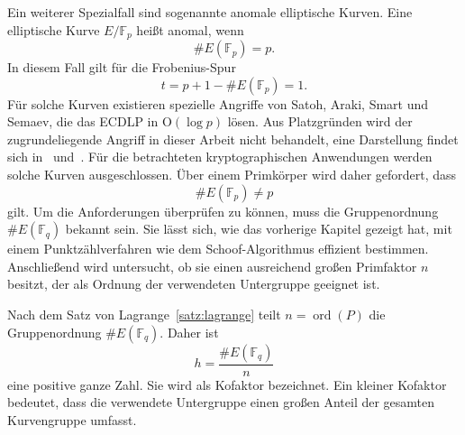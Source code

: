 Ein weiterer Spezialfall sind sogenannte anomale elliptische Kurven. Eine elliptische Kurve $E/\mathbb F_p$ heißt anomal, wenn
\[
    \#E(\mathbb F_p)=p.
\]
In diesem Fall gilt für die Frobenius-Spur
\[
    t=p+1-\#E(\mathbb F_p)=1.
\]
Für solche Kurven existieren spezielle Angriffe von Satoh, Araki, Smart und Semaev, die das ECDLP in $\mathrm{O}(\log p)$ lösen. Aus Platzgründen wird der zugrundeliegende Angriff in dieser Arbeit nicht behandelt, eine Darstellung findet sich in~\cite[S.~89--95]{werner02} und~\cite{smart99}. Für die betrachteten kryptographischen Anwendungen werden solche Kurven ausgeschlossen. Über einem Primkörper wird daher gefordert, dass
\[
    \#E(\mathbb{F}_p)\neq p
\]
gilt. Um die Anforderungen überprüfen zu können, muss die Gruppenordnung $\#E(\mathbb{F}_q)$ bekannt sein. Sie lässt sich, wie das vorherige Kapitel gezeigt hat, mit einem Punktzählverfahren wie dem Schoof-Algorithmus effizient bestimmen. Anschließend wird untersucht, ob sie einen ausreichend großen Primfaktor $n$ besitzt, der als Ordnung der verwendeten Untergruppe geeignet ist.

Nach dem Satz von Lagrange~\ref{satz:lagrange} teilt $n=\operatorname{ord}(P)$ die Gruppenordnung $\#E(\mathbb{F}_q)$. Daher ist
\[
    h=\frac{\#E(\mathbb{F}_q)}{n}
\]
eine positive ganze Zahl. Sie wird als Kofaktor bezeichnet. Ein kleiner Kofaktor bedeutet, dass die verwendete Untergruppe einen großen Anteil der gesamten Kurvengruppe umfasst.

